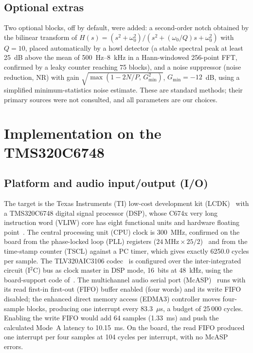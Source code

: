 \documentclass[conference]{IEEEtran}
\begin{document}
\subsection{Optional extras}
Two optional blocks, off by default, were added: a second-order notch obtained by the bilinear transform of $H(s)=(s^2+\omega_0^2)/(s^2+(\omega_0/Q)s+\omega_0^2)$ with $Q=10$, placed automatically by a howl detector (a stable spectral peak at least 25~dB above the mean of 500~Hz--8~kHz in a Hann-windowed 256-point FFT, confirmed by a leaky counter reaching 75 blocks), and a noise suppressor (noise reduction, NR) with gain $\sqrt{\max(1-2N/P,\,G_{\min}^2)}$, $G_{\min}=-12$~dB, using a simplified minimum-statistics noise estimate. These are standard methods; their primary sources were not consulted, and all parameters are our choices.

\section{Implementation on the TMS320C6748}\label{sec:impl}
\subsection{Platform and audio input/output (I/O)}
The target is the Texas Instruments (TI) low-cost development kit (LCDK)~\cite{ti_spruil2} with a TMS320C6748 digital signal processor (DSP), whose C674x very long instruction word (VLIW) core has eight functional units and hardware floating point~\cite{ti_sprs590,ti_sprufe8}. The central processing unit (CPU) clock is 300~MHz, confirmed on the board from the phase-locked loop (PLL) registers ($24~\mathrm{MHz}\times25/2$)~\cite{ti_spruh79} and from the time-stamp counter (TSCL) against a PC timer, which gives exactly 6250.0 cycles per sample. The TLV320AIC3106 codec~\cite{ti_slas509} is configured over the inter-integrated circuit (I$^2$C) bus as clock master in DSP mode, 16~bits at 48~kHz, using the board-support code of~\cite{welch2017}. The multichannel audio serial port (McASP)~\cite{ti_sprufm1} runs with its read first-in first-out (FIFO) buffer enabled (four words) and its write FIFO disabled; the enhanced direct memory access (EDMA3) controller moves four-sample blocks, producing one interrupt every 83.3~$\mu$s, a budget of 25\,000 cycles. Enabling the write FIFO would add 64 samples (1.33~ms) and push the calculated Mode~A latency to 10.15~ms. On the board, the read FIFO produced one interrupt per four samples at 104 cycles per interrupt, with no McASP errors.
\end{document}
